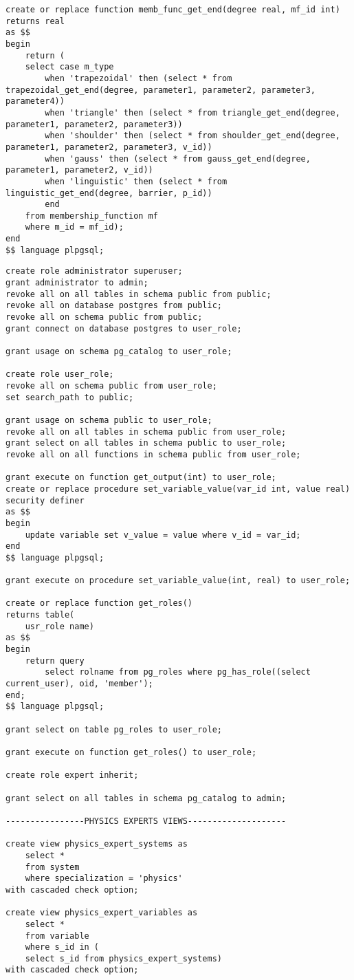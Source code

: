 \begin{lstlisting}[caption={Функции, используемые для дефаззификации методом центра тяжести для дискретных множеств (часть 4)}]
create or replace function memb_func_get_end(degree real, mf_id int)
returns real 
as $$
begin 
	return (
	select case m_type 
		when 'trapezoidal' then (select * from trapezoidal_get_end(degree, parameter1, parameter2, parameter3, parameter4))
		when 'triangle' then (select * from triangle_get_end(degree, parameter1, parameter2, parameter3))
		when 'shoulder' then (select * from shoulder_get_end(degree, parameter1, parameter2, parameter3, v_id))
		when 'gauss' then (select * from gauss_get_end(degree, parameter1, parameter2, v_id))
		when 'linguistic' then (select * from linguistic_get_end(degree, barrier, p_id))
		end
	from membership_function mf
	where m_id = mf_id);
end
$$ language plpgsql;
\end{lstlisting}
\begin{lstlisting}[caption=Создание ролей на уровне базы данных (часть 1), label={lst:roles}]
create role administrator superuser;
grant administrator to admin;
revoke all on all tables in schema public from public;
revoke all on database postgres from public;
revoke all on schema public from public;
grant connect on database postgres to user_role;

grant usage on schema pg_catalog to user_role;

create role user_role;
revoke all on schema public from user_role;
set search_path to public;

grant usage on schema public to user_role;
revoke all on all tables in schema public from user_role;
grant select on all tables in schema public to user_role;
revoke all on all functions in schema public from user_role;

grant execute on function get_output(int) to user_role;
create or replace procedure set_variable_value(var_id int, value real)
security definer
as $$
begin
	update variable set v_value = value where v_id = var_id;
end
$$ language plpgsql; 

grant execute on procedure set_variable_value(int, real) to user_role;

create or replace function get_roles() 
returns table(
	usr_role name)
as $$
begin
	return query 
		select rolname from pg_roles where pg_has_role((select current_user), oid, 'member');
end;
$$ language plpgsql; 

grant select on table pg_roles to user_role;

grant execute on function get_roles() to user_role;

create role expert inherit;

grant select on all tables in schema pg_catalog to admin;

----------------PHYSICS EXPERTS VIEWS--------------------

create view physics_expert_systems as 
	select * 
	from system 
	where specialization = 'physics' 
with cascaded check option;

create view physics_expert_variables as 
	select * 
	from variable 
	where s_id in (
	select s_id from physics_expert_systems)
with cascaded check option;
\end{lstlisting}
